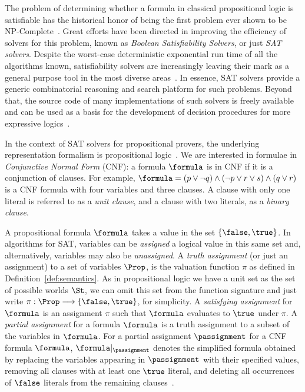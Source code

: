 The problem of determining whether a formula in classical propositional logic is
satisfiable has the historical honor of being the first problem ever shown to be
NP-Complete~\cite{Cook}. Great efforts have been directed in improving the
efficiency of solvers for this problem, known as \emph{Boolean Satisfiability
Solvers}, or just \emph{SAT solvers}. Despite the worst-case deterministic
exponential run time of all the algorithms known, satisfiability solvers are
increasingly leaving their mark as a general purpose tool in the most diverse
areas~\cite{satchapter}. In essence, SAT solvers provide a generic combinatorial
reasoning and search platform for such problems.  Beyond that, the source code
of many implementations of such solvers is freely available and can be used as a
basis for the development of decision procedures for more expressive
logics~\cite{giunchiglia2002sat}.

In the context of SAT solvers for propositional provers, the underlying
representation formalism is propositional logic~\cite{satchapter}. We are
interested in formulae in \emph{Conjunctive Normal Form} (CNF): a formula
$\formula$ is in CNF if it is a conjunction of clauses. For example, $\formula =
(p \lor \neg q) \land (\neg p \lor r \lor s) \land (q \lor r)$ is a CNF formula
with four variables and three clauses. A clause with only one literal is
referred to as a \emph{unit clause}, and a clause with two literals, as a
\emph{binary clause}.

A propositional formula $\formula$ takes a value in the set $\{\false, \true\}$. In
algorithms for SAT, variables can be \emph{assigned} a logical value in this same
set and, alternatively, variables may also be \emph{unassigned}. A \emph{truth
assignment} (or just an assignment) to a set of variables $\Prop$, is the valuation
function $\pi$ as defined in Definition~\ref{def:semantics}. As in propositional
logic we have a unit set as the set of possible worlds $\St$, we can omit this
set from the function signature and just write $\pi : \Prop \longrightarrow
\{\false,\true\}$, for simplicity. A \emph{satisfying assignment} for $\formula$
is an assignment $\pi$ such that $\formula$ evaluates to $\true$ under $\pi$.  A
\emph{partial assignment} for a formula $\formula$ is a truth assignment to a
subset of the variables in $\formula$. For a partial assignment $\passignment$
for a CNF formula $\formula$, $\formula|_\passignment$ denotes the simplified
formula obtained by replacing the variables appearing in $\passignment$ with
their specified values, removing all clauses with at least one $\true$ literal,
and deleting all occurrences of $\false$ literals from the remaining
clauses~\cite{satchapter}.   

